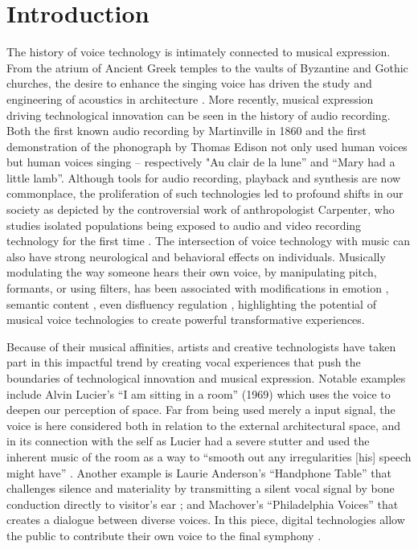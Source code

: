 \documentclass[sigconf]{nimeart}
\begin{document}
\section{Introduction}\label{introduction}

The history of voice technology is intimately connected to musical expression. From the atrium of Ancient Greek temples to the vaults of Byzantine and Gothic churches, the desire to enhance the singing voice has driven the study and engineering of acoustics in architecture \cite{declercq2007acoustic,noxon2001understanding}. More recently, musical expression driving technological innovation can be seen in the history of audio recording. Both the first known audio recording by Martinville in 1860 and the first demonstration of the phonograph by Thomas Edison not only used human voices but human voices singing \cite{feaster2010edouard,linder2001thomas} -- respectively "Au clair de la lune'' and ``Mary had a little lamb''. Although tools for audio recording, playback and synthesis are now commonplace, the proliferation of such technologies led to profound shifts in our society as depicted by the controversial work of anthropologist Carpenter, who studies isolated populations being exposed to audio and video recording technology for the first time \cite{prins2001edmund}. \textbf{} The intersection of voice technology with music can also have strong neurological and behavioral effects on individuals. Musically modulating the way someone hears their own voice, by manipulating pitch, formants, or using filters, has been associated with modifications in emotion \cite{costa2018regulating,aucouturier2016covert}, semantic content \cite{kleinberger2019speech}, even disfluency regulation \cite{kleinberger2020vocal}, highlighting the potential of musical voice technologies to create powerful transformative experiences.

Because of their musical affinities, artists and creative technologists have taken part in this impactful trend by creating vocal experiences that push the boundaries of technological innovation and musical expression. Notable examples include Alvin Lucier's ``I am sitting in a room'' (1969) which uses the voice to deepen our perception of space. Far from being used merely a input signal, the voice is here considered both in relation to the external architectural space, and in its connection with the self as Lucier had a severe stutter and used the inherent music of the room as a way to ``\hspace{0pt}\hspace{0pt}smooth out any irregularities {[}his{]} speech might have'' \cite{lucier1970sitting}. Another example is Laurie Anderson's ``Handphone Table'' that challenges silence and materiality by transmitting a silent vocal signal by bone conduction directly to visitor's ear \cite{li2013voice}; and Machover's ``Philadelphia Voices'' that creates a dialogue between diverse voices. In this piece, digital technologies allow the public to contribute their own voice to the final symphony \cite{van2013constellation}.
\end{document}
